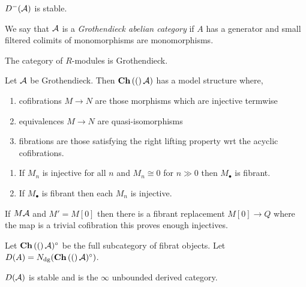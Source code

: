 \documentclass[12pt]{article}
\begin{document}
\begin{prop}[Prop 1.3.2.10]
$D^{-}(\mathcal{A})$ is stable. 
\end{prop}

\begin{defn}
We say that $\mathcal{A}$ is a \textit{Grothendieck abelian category} if $A$ has a generator and small filtered colimits of monomorphisms are monomorphisms.
\end{defn}

\begin{example}
The category of $R$-modules is Grothendieck.
\end{example}

\begin{theorem}
Let $\mathcal{A}$ be Grothendieck. Then $\mathbf{Ch}\left( ( \right)\mathcal{A})$ has a model structure where,
\begin{enumerate}
\item cofibrations $M \to N$ are those morphisms which are injective termwise
\item equivalences $M \to N$ are quasi-isomorphisms
\item fibrations are those satisfying the right lifting property wrt the acyclic cofibrations.
\end{enumerate}
\end{theorem}

\begin{prop}[1.3.5.6]
\begin{enumerate}
\item If $M_n$ is injective for all $n$ and $M_n \cong 0$ for $n \gg 0$ then $M_\bullet$ is fibrant.
\item If $M_\bullet$ is fibrant then each $M_n$ is injective. 
\end{enumerate}
\end{prop}

If $M \mathcal{A}$ and $M' = M[0]$ then there is a fibrant replacement $M[0] \to Q$ where the map is a trivial cofibration this proves enough injectives.

\begin{defn}
Let $\mathbf{Ch}\left( ( \right)\mathcal{A})^\circ$ be the full subcategory of fibrat objects. Let $D(A) = N_{\mathrm{dg}}(\mathbf{Ch}\left( ( \right)\mathcal{A})^\circ)$.
\end{defn}

\begin{prop}
$D(\mathcal{A})$ is stable and is the $\infty$ unbounded derived category. 
\end{prop}

\newcommand{\dlim}{\varinjlim}
\newcommand{\ilim}{\varprojlim}
\newcommand{\plim}{\varprojlim}
\end{document}
